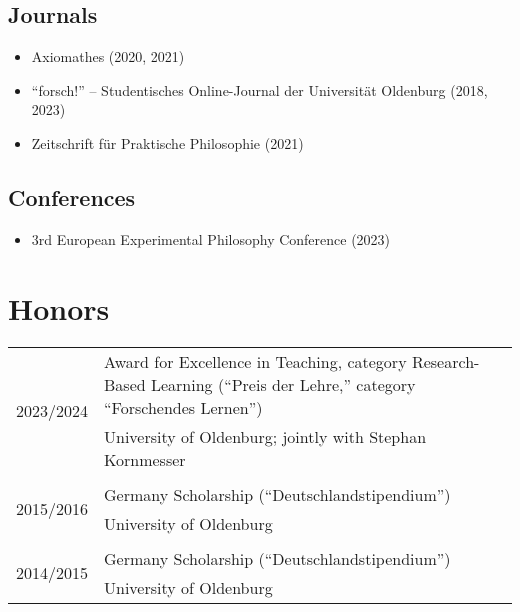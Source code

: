 \documentclass[a4paper,10pt]{article}
\begin{document}
\subsection*{Journals}
\begin{itemize}
   \item Axiomathes (2020, 2021)
   \item \enquote{forsch!} -- Studentisches Online-Journal der Universität Oldenburg (2018, 2023)
   \item Zeitschrift für Praktische Philosophie (2021)
\end{itemize}

\subsection*{Conferences}
\begin{itemize}
   \item 3rd European Experimental Philosophy Conference (2023)
\end{itemize}


\clearpage
\section{Honors}
\begin{longtable}{p{2.25cm}p{11cm}}

\multirow{2}{2.25cm}{\footnotesize{2023/2024}} & Award for Excellence in Teaching, category Research-Based Learning (\enquote{Preis der Lehre,} category \enquote{Forschendes Lernen})\\
& \footnotesize{University of Oldenburg; jointly with Stephan Kornmesser}\\
\\
\multirow{2}{2.25cm}{\footnotesize{2015/2016}} & Germany Scholarship (\enquote{Deutschlandstipendium})\\
& \footnotesize{University of Oldenburg}\\
\\
\multirow{2}{2.25cm}{\footnotesize{2014/2015}} & Germany Scholarship (\enquote{Deutschlandstipendium})\\
& \footnotesize{University of Oldenburg}\\
\end{longtable}


\clearpage
\end{document}
